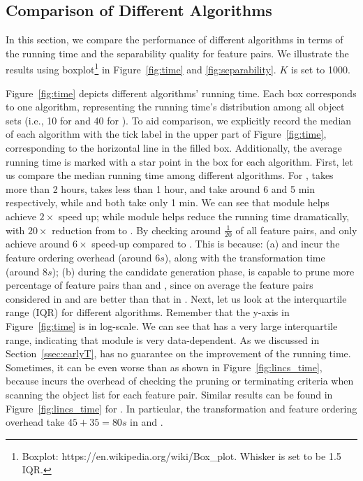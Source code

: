 \subsection{Comparison of Different Algorithms}
In this section, we compare the performance of different algorithms in terms of the running time and the separability quality for \topk feature pairs. We illustrate the results using boxplot\footnote{Boxplot: https://en.wikipedia.org/wiki/Box\_plot. Whisker is set to be 1.5 IQR.} in Figure~\ref{fig:time} and \ref{fig:separability}. $K$ is set to 1000.



 Figure~\ref{fig:time} depicts different algorithms' running time. Each box corresponds to one algorithm, representing the running time's distribution among all object sets (i.e., 10 for \msig and 40 for \lincs). 
To aid comparison, we explicitly record the median of each algorithm with the tick label in the upper part of Figure~\ref{fig:time}, corresponding to the horizontal line in the filled box. Additionally, the average running time is marked with a star point in the box for each algorithm. First, let us compare the median running time among different algorithms. For \msig, \baseline takes more than 2 hours, \earlyOrder takes less than 1 hour, \samp and \sampOpt take around 6 and 5 min respectively, while \horiz and \vertic both take only 1 min. We can see that \earlyT module helps achieve $2\times$ speed up; while \sampling module helps reduce the running time dramatically, with $20\times$ reduction from \baseline to \sampOpt. By checking around $\frac{1}{20}$ of all feature pairs, \horiz and \vertic only achieve around $6\times$ speed-up compared to \sampOpt. This is because: (a) \horiz and \vertic incur the feature ordering overhead (around $6s$), along with the transformation time (around $8s$); (b) during the candidate generation phase, \sampOpt is capable to prune more percentage of feature pairs than \horiz and \vertic, since on average the feature pairs considered in \horiz and \vertic are better than that in \sampOpt. Next, let us look at the interquartile range (IQR) for different algorithms. Remember that the y-axis in Figure~\ref{fig:time} is in log-scale. We can see that \earlyOrder has a very large interquartile range, indicating that \earlyT module is very data-dependent. As we discussed in Section~\ref{ssec:earlyT}, \earlyT has no guarantee on the improvement of the running time. Sometimes, it can be even worse than \baseline as shown in Figure~\ref{fig:lincs_time}, because \earlyT incurs the overhead of checking the pruning or terminating criteria when scanning the object list for each feature pair.
Similar results can be found in Figure~\ref{fig:lincs_time} for \lincs. In particular, the transformation and feature ordering overhead take $45+35=80s$ in \horiz and \vertic.

